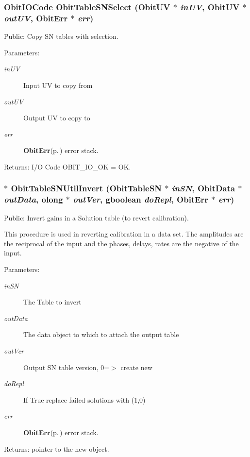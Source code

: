\subsubsection{\setlength{\rightskip}{0pt plus 5cm}Obit\-IOCode Obit\-Table\-SNSelect ({\bf Obit\-UV} $\ast$ {\em in\-UV}, {\bf Obit\-UV} $\ast$ {\em out\-UV}, {\bf Obit\-Err} $\ast$ {\em err})}\label{ObitTableSNUtil_8c_a0}


Public: Copy SN tables with selection. 

\begin{Desc}
\item[Parameters:]
\begin{description}
\item[{\em in\-UV}]Input UV to copy from \item[{\em out\-UV}]Output UV to copy to \item[{\em err}]{\bf Obit\-Err}{\rm (p.\,\pageref{structObitErr})} error stack. \end{description}
\end{Desc}
\begin{Desc}
\item[Returns:]I/O Code OBIT\_\-IO\_\-OK = OK. \end{Desc}
\subsubsection{$\ast$ Obit\-Table\-SNUtil\-Invert ({\bf Obit\-Table\-SN} $\ast$ {\em in\-SN}, {\bf Obit\-Data} $\ast$ {\em out\-Data}, {\bf olong} $\ast$ {\em out\-Ver}, gboolean {\em do\-Repl}, {\bf Obit\-Err} $\ast$ {\em err})}\label{ObitTableSNUtil_8c_a1}


Public: Invert gains in a Solution table (to revert calibration). 

This procedure is used in reverting calibration in a data set. The amplitudes are the reciprocal of the input and the phases, delays, rates are the negative of the input. \begin{Desc}
\item[Parameters:]
\begin{description}
\item[{\em in\-SN}]The Table to invert \item[{\em out\-Data}]The data object to which to attach the output table \item[{\em out\-Ver}]Output SN table version, 0=$>$ create new \item[{\em do\-Repl}]If True replace failed solutions with (1,0) \item[{\em err}]{\bf Obit\-Err}{\rm (p.\,\pageref{structObitErr})} error stack. \end{description}
\end{Desc}
\begin{Desc}
\item[Returns:]pointer to the new object. \end{Desc}
